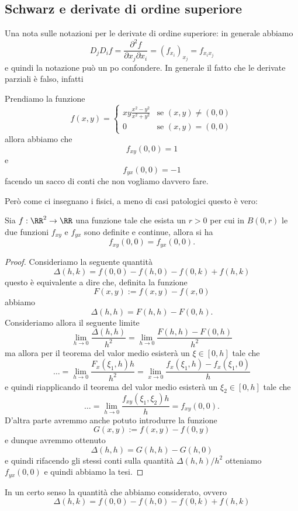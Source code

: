 \documentclass[11pt]{scrartcl}
\begin{document}
	\subsection{Schwarz e derivate di ordine superiore}
	Una nota sulle notazioni per le derivate di ordine superiore: in generale abbiamo
	$$D_jD_if=\frac{\partial^2 f }{\partial x_j \partial x_i}=\left(f_{x_i}\right)_{x_j}=f_{x_ix_j}$$
	e quindi la notazione può un po confondere. In generale il fatto che le derivate parziali è falso, infatti
	\begin{example}
		Prendiamo la funzione
		$$f(x,y)=
		\begin{cases}
			xy\frac{x^2-y^2}{x^2+y^2} & \text{se $(x,y)\ne (0,0)$} \\
			0 & \text{se $(x,y)=(0,0)$}
		\end{cases}
		$$
		allora abbiamo che 
		$$f_{xy}(0,0)=1$$
		e 
		$$f_{yx}(0,0)=-1$$
		facendo un sacco di conti che non vogliamo davvero fare.
	\end{example}
	Però come ci insegnano i fisici, a meno di casi patologici questo è vero:
	\begin{theorem}
		Sia $f:\RR^2\to\RR$ una funzione tale che esista un $r>0$ per cui in $B(0,r)$ le due funzioni $f_{xy}$ e $f_{yx}$ sono definite e continue, allora si ha
		$$f_{xy}(0,0)=f_{yx}(0,0).$$
	\end{theorem}
	\begin{proof}
		Consideriamo la seguente quantità
		$$\Delta(h,k)=f(0,0)-f(h,0)-f(0,k)+f(h,k)$$
		questo è equivalente a dire che, definita la funzione
		$$F(x,y):=f(x,y)-f(x,0)$$
		abbiamo 
		$$\Delta(h,h)=F(h,h)-F(0,h).$$
		Consideriamo allora il seguente limite
		$$\lim_{h\to 0}\frac{\Delta (h,h)}{h^2}=\lim_{h\to 0}\frac{F(h,h)-F(0,h)}{h^2}$$
		ma allora per il teorema del valor medio esisterà un $\xi\in [0,h]$ tale che
		$$\dots = \lim_{h\to 0}\frac{F_x(\xi_1,h)h}{h^2}=\lim_{x\to 0} \frac{f_x(\xi_1,h)-f_x(\xi_1,0)}{h}$$
		e quindi riapplicando il teorema del valor medio esisterà un $\xi_2\in [0,h]$ tale che 
		$$\dots = \lim_{h\to 0}\frac{f_{xy}(\xi_1,\xi_2)h}{h}=f_{xy}(0,0).$$
		D'altra parte avremmo anche potuto introdurre la funzione 
		$$G(x,y):= f(x,y)-f(0,y)$$
		e dunque avremmo ottenuto
		$$\Delta(h,h)=G(h,h)-G(h,0)$$
		e quindi rifacendo gli stessi conti sulla quantità $\Delta(h,h)/h^2$ otteniamo $f_{yx}(0,0)$ e quindi abbiamo la tesi.
	\end{proof}
	In un certo senso la quantità che abbiamo considerato, ovvero
	$$\Delta(h,k)=f(0,0)-f(h,0)-f(0,k)+f(h,k)$$
\end{document}
